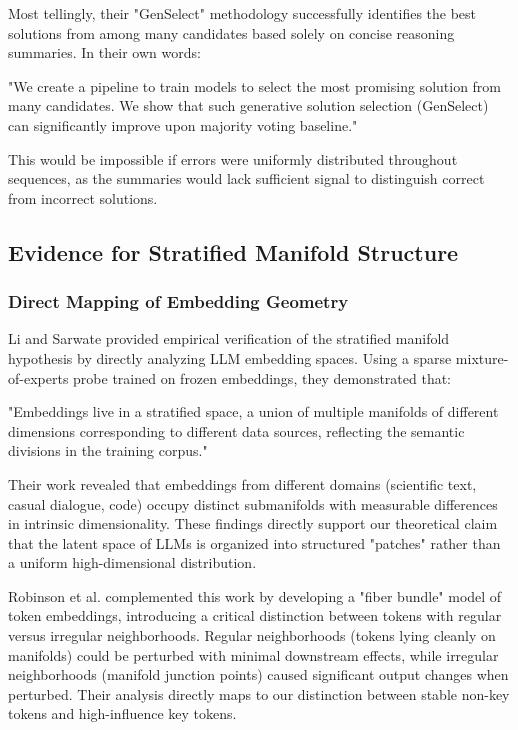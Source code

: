 \documentclass{article}
\begin{document}
Most tellingly, their "GenSelect" methodology successfully identifies the best solutions from among many candidates based solely on concise reasoning summaries. In their own words:

"We create a pipeline to train models to select the most promising solution from many candidates. We show that such generative solution selection (GenSelect) can significantly improve upon majority voting baseline." \citep{moshkov2025aimo}

This would be impossible if errors were uniformly distributed throughout sequences, as the summaries would lack sufficient signal to distinguish correct from incorrect solutions.

\subsection{Evidence for Stratified Manifold Structure}

\subsubsection{Direct Mapping of Embedding Geometry}

Li and Sarwate \citep{li2025unraveling} provided empirical verification of the stratified manifold hypothesis by directly analyzing LLM embedding spaces. Using a sparse mixture-of-experts probe trained on frozen embeddings, they demonstrated that:

"Embeddings live in a stratified space, a union of multiple manifolds of different dimensions corresponding to different data sources, reflecting the semantic divisions in the training corpus." \citep{li2025unraveling}

Their work revealed that embeddings from different domains (scientific text, casual dialogue, code) occupy distinct submanifolds with measurable differences in intrinsic dimensionality. These findings directly support our theoretical claim that the latent space of LLMs is organized into structured "patches" rather than a uniform high-dimensional distribution.

Robinson et al. \citep{robinson2023token} complemented this work by developing a "fiber bundle" model of token embeddings, introducing a critical distinction between tokens with regular versus irregular neighborhoods. Regular neighborhoods (tokens lying cleanly on manifolds) could be perturbed with minimal downstream effects, while irregular neighborhoods (manifold junction points) caused significant output changes when perturbed. Their analysis directly maps to our distinction between stable non-key tokens and high-influence key tokens.
\end{document}
